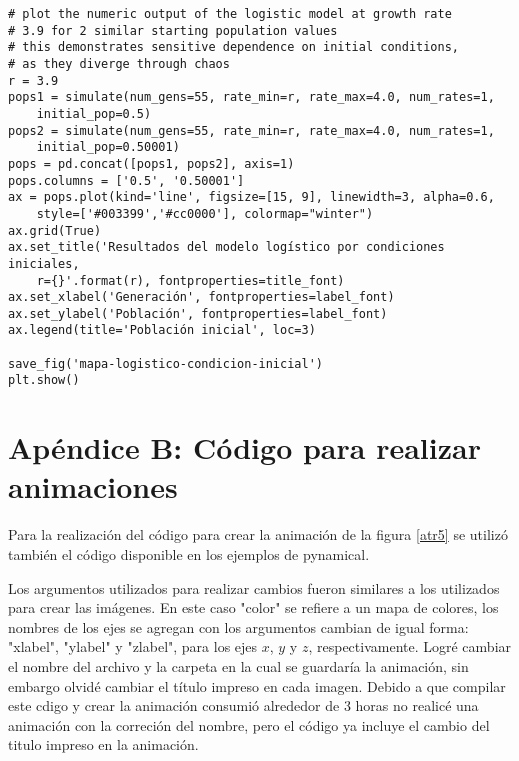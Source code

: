 \begin{verbatim}
# plot the numeric output of the logistic model at growth rate 
# 3.9 for 2 similar starting population values
# this demonstrates sensitive dependence on initial conditions, 
# as they diverge through chaos
r = 3.9
pops1 = simulate(num_gens=55, rate_min=r, rate_max=4.0, num_rates=1, 
	initial_pop=0.5)
pops2 = simulate(num_gens=55, rate_min=r, rate_max=4.0, num_rates=1,		
	initial_pop=0.50001)
pops = pd.concat([pops1, pops2], axis=1)
pops.columns = ['0.5', '0.50001']
ax = pops.plot(kind='line', figsize=[15, 9], linewidth=3, alpha=0.6,
	style=['#003399','#cc0000'], colormap="winter")
ax.grid(True)
ax.set_title('Resultados del modelo logístico por condiciones iniciales, 
	r={}'.format(r), fontproperties=title_font)
ax.set_xlabel('Generación', fontproperties=label_font)
ax.set_ylabel('Población', fontproperties=label_font)
ax.legend(title='Población inicial', loc=3)

save_fig('mapa-logistico-condicion-inicial')
plt.show()
\end{verbatim}

\section*{Apéndice B: Código para realizar animaciones}
\noindent Para la realización del código para crear la animación de la figura \ref{atr5} se utilizó también el código disponible en los ejemplos de pynamical.

Los argumentos utilizados para realizar cambios fueron similares a los utilizados para crear las imágenes. En este caso "color" se refiere a un mapa de colores, los nombres de los ejes se agregan con los argumentos cambian de igual forma: "\textsf{xlabel}", "\textsf{ylabel}" y "\textsf{zlabel}", para los ejes $x$, $y$ y $z$, respectivamente. Logré cambiar el nombre del archivo y la carpeta en la cual se guardaría la animación, sin embargo olvidé cambiar el título impreso en cada imagen. Debido a que compilar este cdigo y crear la animación consumió alrededor de 3 horas no realicé una animación con la correción del nombre, pero el código ya incluye el cambio del titulo impreso en la animación.

